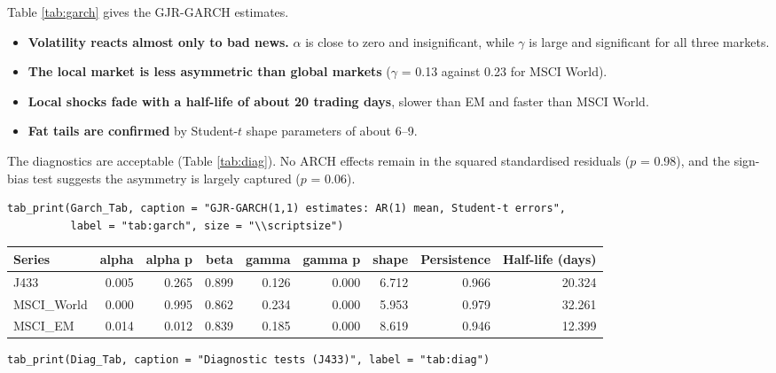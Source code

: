 \documentclass[11pt,preprint]{elsarticle}
\let\origtable\table
\let\endorigtable\endtable
\renewenvironment{table}[1][2] {
    \expandafter\origtable\expandafter[H]
} {
    \endorigtable
}
\numberwithin{equation}{section}
\numberwithin{figure}{section}
\numberwithin{table}{section}
\def\tightlist{} %
\begin{document}
Table \ref{tab:garch} gives the GJR-GARCH estimates.

\begin{itemize}
\tightlist
\item
  \textbf{Volatility reacts almost only to bad news.} \(\alpha\) is
  close to zero and insignificant, while \(\gamma\) is large and
  significant for all three markets.
\item
  \textbf{The local market is less asymmetric than global markets}
  (\(\gamma\) = 0.13 against 0.23 for MSCI World).
\item
  \textbf{Local shocks fade with a half-life of about 20 trading days},
  slower than EM and faster than MSCI World.
\item
  \textbf{Fat tails are confirmed} by Student-\(t\) shape parameters of
  about 6--9.
\end{itemize}

The diagnostics are acceptable (Table \ref{tab:diag}). No ARCH effects
remain in the squared standardised residuals (\(p\) = 0.98), and the
sign-bias test suggests the asymmetry is largely captured (\(p\) =
0.06).

\begin{verbatim}
tab_print(Garch_Tab, caption = "GJR-GARCH(1,1) estimates: AR(1) mean, Student-t errors",
          label = "tab:garch", size = "\\scriptsize")
\end{verbatim}

\begin{table}[!htbp]
\centering
\caption{GJR-GARCH(1,1) estimates: AR(1) mean, Student-t errors} 
\label{tab:garch}
\begingroup\scriptsize
\begin{tabular}{lrrrrrrrr}
  \hline
Series & alpha & alpha p & beta & gamma & gamma p & shape & Persistence & Half-life (days) \\ 
  \hline
J433 & 0.005 & 0.265 & 0.899 & 0.126 & 0.000 & 6.712 & 0.966 & 20.324 \\ 
  MSCI\_World & 0.000 & 0.995 & 0.862 & 0.234 & 0.000 & 5.953 & 0.979 & 32.261 \\ 
  MSCI\_EM & 0.014 & 0.012 & 0.839 & 0.185 & 0.000 & 8.619 & 0.946 & 12.399 \\ 
   \hline
\end{tabular}
\endgroup
\end{table}

\begin{verbatim}
tab_print(Diag_Tab, caption = "Diagnostic tests (J433)", label = "tab:diag")
\end{verbatim}
\end{document}
